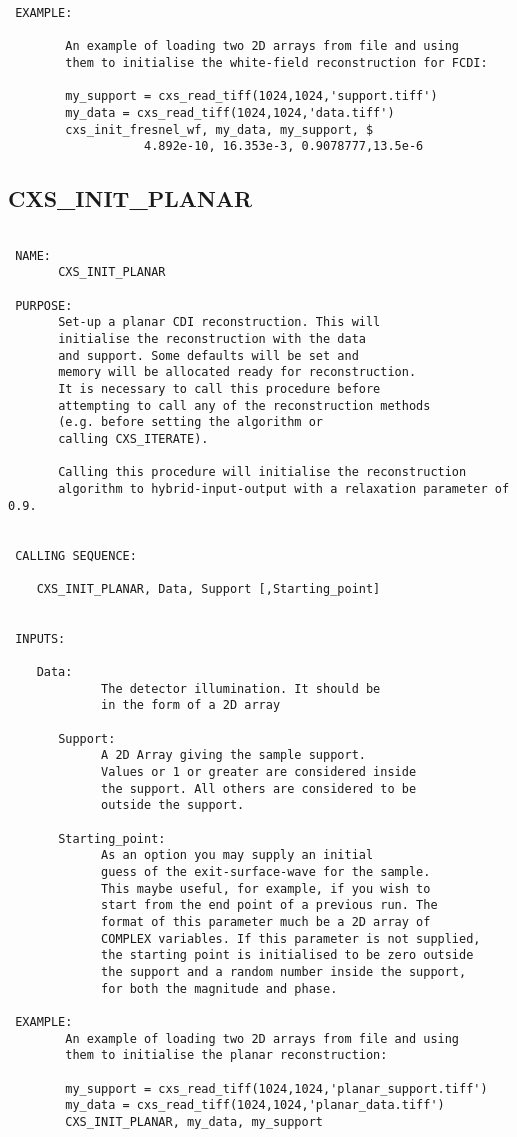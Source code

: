 \begin{verbatim}
 EXAMPLE:

        An example of loading two 2D arrays from file and using
        them to initialise the white-field reconstruction for FCDI:

        my_support = cxs_read_tiff(1024,1024,'support.tiff')
        my_data = cxs_read_tiff(1024,1024,'data.tiff')
        cxs_init_fresnel_wf, my_data, my_support, $
                   4.892e-10, 16.353e-3, 0.9078777,13.5e-6

\end{verbatim}

\subsection{CXS\_INIT\_PLANAR}
\begin{verbatim}

 NAME:
       CXS_INIT_PLANAR

 PURPOSE:
       Set-up a planar CDI reconstruction. This will
       initialise the reconstruction with the data
       and support. Some defaults will be set and
       memory will be allocated ready for reconstruction.
       It is necessary to call this procedure before
       attempting to call any of the reconstruction methods
       (e.g. before setting the algorithm or 
       calling CXS_ITERATE).

       Calling this procedure will initialise the reconstruction 
       algorithm to hybrid-input-output with a relaxation parameter of 0.9.


 CALLING SEQUENCE:

	CXS_INIT_PLANAR, Data, Support [,Starting_point]


 INPUTS:

	Data: 
             The detector illumination. It should be
             in the form of a 2D array

       Support: 
             A 2D Array giving the sample support.
             Values or 1 or greater are considered inside
             the support. All others are considered to be
             outside the support.

       Starting_point: 
             As an option you may supply an initial 
             guess of the exit-surface-wave for the sample. 
             This maybe useful, for example, if you wish to 
             start from the end point of a previous run. The
             format of this parameter much be a 2D array of
             COMPLEX variables. If this parameter is not supplied,
             the starting point is initialised to be zero outside
             the support and a random number inside the support, 
             for both the magnitude and phase.

 EXAMPLE:
        An example of loading two 2D arrays from file and using
        them to initialise the planar reconstruction:

        my_support = cxs_read_tiff(1024,1024,'planar_support.tiff')
        my_data = cxs_read_tiff(1024,1024,'planar_data.tiff')
        CXS_INIT_PLANAR, my_data, my_support


\end{verbatim}
